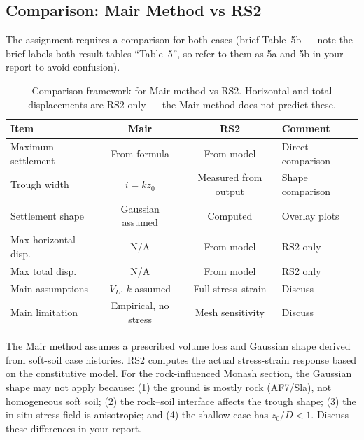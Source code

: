 \documentclass[a4paper,12pt]{article}
\begin{document}
\subsection{Comparison: Mair Method vs RS2}
The assignment requires a comparison for both cases (brief Table~5b --- note the brief labels both result tables ``Table~5'', so refer to them as 5a and 5b in your report to avoid confusion).

\begin{table}[h!]
\centering
\small
\begin{tabularx}{\textwidth}{l c c X}
\toprule
\textbf{Item} & \textbf{Mair} & \textbf{RS2} & \textbf{Comment} \\
\midrule
Maximum settlement   & From formula        & From model            & Direct comparison \\
Trough width & $i = k z_0$         & Measured from output  & Shape comparison \\
Settlement shape     & Gaussian assumed    & Computed              & Overlay plots \\
Max horizontal disp. & N/A                 & From model            & RS2 only \\
Max total disp.      & N/A                 & From model            & RS2 only \\
Main assumptions     & $V_L$, $k$ assumed  & Full stress--strain   & Discuss \\
Main limitation      & Empirical, no stress & Mesh sensitivity & Discuss \\
\bottomrule
\end{tabularx}
\caption{Comparison framework for Mair method vs RS2. Horizontal and total displacements are RS2-only --- the Mair method does not predict these.}
\label{tab:comparison}
\end{table}

\begin{warnbox}
The Mair method assumes a prescribed volume loss and Gaussian shape derived from soft-soil case histories. RS2 computes the actual stress-strain response based on the constitutive model. For the rock-influenced Monash section, the Gaussian shape may not apply because: (1) the ground is mostly rock (AF7/Sla), not homogeneous soft soil; (2) the rock--soil interface affects the trough shape; (3) the in-situ stress field is anisotropic; and (4) the shallow case has $z_0/D < 1$. Discuss these differences in your report.
\end{warnbox}

\end{document}
